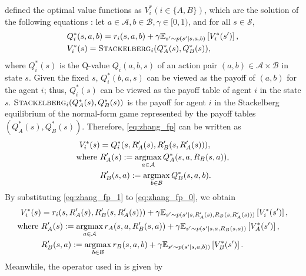\documentclass{acml}
\providecommand{\argmax}{\operatornamewithlimits{argmax}} %
\providecommand{\E}{\mathbb{E}} %
\providecommand{\x}{\times}
\providecommand{\where}{\mathrm{where~}}
\begin{document}
\citet{Zhang2020-hw} defined the optimal value functions as $V_i^* (i\in\{A,B\})$, which are the solution of the following equations \citep{Zhang2020-hw}: let $a\in\mathcal{A}, b\in\mathcal{B}, \gamma\in[0,1)$,  and for all $s\in\mathcal{S}$,
\begin{align}
	&Q_i^*(s,a,b) = r_i(s,a,b) + \gamma \E_{s'\sim p(s'|s,a,b)} \left[V_i^*(s')\right],\label{eq:zhang_fp_1}\\
	&V_i^*(s) = \textsc{Stackelberg}_i(Q_A^*(s),Q_B^*(s)),\label{eq:zhang_fp}
\end{align}
where $Q_i^*(s)$ is the Q-value $Q_i(a,b,s)$ of an action pair $(a,b)\in\mathcal{A}\x\mathcal{B}$ in state $s$.
Given the fixed $s$, $Q_i^*(b,a,s)$ can be viewed as the payoff of $(a,b)$ for the agent $i$; thus, $Q_i^*(s)$ can be viewed as the payoff table of agent $i$ in the state $s$.
$\textsc{Stackelberg}_i(Q_A^*(s),Q_B^*(s))$ is the payoff for agent $i$ in the Stackelberg equilibrium of the normal-form game represented by the payoff tables $(Q_A^*(s),Q_B^*(s))$.
Therefore, \cref{eq:zhang_fp} can be written as
\begin{subequations}\label{eq:zhang_fp_0}
	\begin{align}
		V_i^*(s) &= Q_i^*(s,R_A'(s),R_B'(s,R_A'(s))),\\
		\where &R_A'(s) := \argmax_{a\in\mathcal{A}}Q_A^*(s,a,R_B(s,a)),\\
		&R_B'(s,a) := \argmax_{b\in\mathcal{B}}Q_B^*(s,a,b).
	\end{align}
\end{subequations}
By substituting \cref{eq:zhang_fp_1} to \cref{eq:zhang_fp_0}, we obtain
\begin{subequations}\label{eq:zhang_fp_2}
	\begin{align}
		V_i^*(s) &= r_i(s,R_A'(s),R_B'(s,R_A'(s))) + \gamma \E_{s'\sim p(s'|s,R_A'(s),R_B(s,R_A'(s)))} \left[V_i^*(s')\right],\\
		\where &R_A'(s) := \argmax_{a\in\mathcal{A}}r_A(s,a,R_B'(s,a)) + \gamma \E_{s'\sim p(s'|s,a,R_B(s,a))} \left[V_A^*(s')\right],\\
		&R_B'(s,a) := \argmax_{b\in\mathcal{B}}r_B(s,a,b) + \gamma \E_{s'\sim p(s'|s,a,b))} \left[V_B^*(s')\right].
	\end{align}
\end{subequations}
Meanwhile, the operator used in \citet{Bucarey2022-ro} is given by
\end{document}
